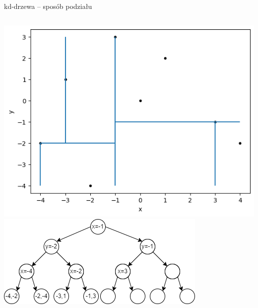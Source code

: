 \documentclass[aspectratio=169,dvipsnames]{beamer}
\begin{document}
\begin{frame}{kd-drzewa -- sposób podziału}
    \begin{columns}
        \includegraphics[width=\textwidth]{images/plots/7}
        \includegraphics[width=\textwidth]{images/trees/9.drawio}
    \end{columns}
\end{frame}
\end{document}
